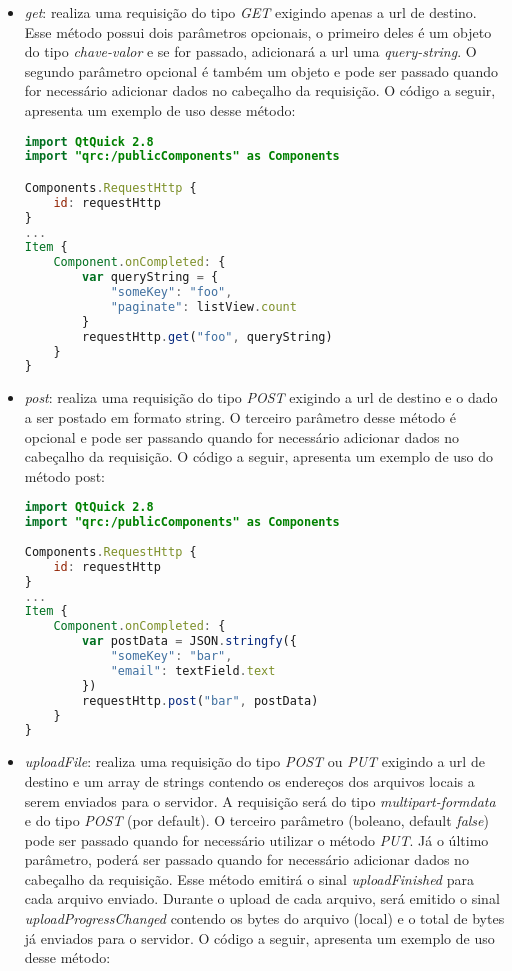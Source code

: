 \begin{itemize}
	\item \textit{get}: realiza uma requisição do tipo \textit{GET} exigindo apenas a url de destino. Esse método possui dois parâmetros opcionais, o primeiro deles é um objeto do tipo \textit{chave-valor} e se for passado, adicionará a url uma \textit{query-string}. O segundo parâmetro opcional é também um objeto e pode ser passado quando for necessário adicionar dados no cabeçalho da requisição. O código a seguir, apresenta um exemplo de uso desse método:

\begin{center}
\begin{lstlisting}[language=qml]
import QtQuick 2.8
import "qrc:/publicComponents" as Components

Components.RequestHttp {
	id: requestHttp
}
...
Item {
	Component.onCompleted: {
		var queryString = {
			"someKey": "foo",
			"paginate": listView.count
		}
		requestHttp.get("foo", queryString)
	}
}
\end{lstlisting}
\end{center}


	\item \textit{post}: realiza uma requisição do tipo \textit{POST} exigindo a url de destino e o dado a ser postado em formato string. O terceiro parâmetro desse método é opcional e pode ser passando quando for necessário adicionar dados no cabeçalho da requisição. O código a seguir, apresenta um exemplo de uso do método post:

\begin{center}
\begin{lstlisting}[language=qml]
import QtQuick 2.8
import "qrc:/publicComponents" as Components
	
Components.RequestHttp {
	id: requestHttp
}
...
Item {
	Component.onCompleted: {
		var postData = JSON.stringfy({
			"someKey": "bar",
			"email": textField.text
		})
		requestHttp.post("bar", postData)
	}
}
\end{lstlisting}
\end{center}


	\item \textit{uploadFile}: realiza uma requisição do tipo \textit{POST} ou \textit{PUT} exigindo a url de destino e um array de strings contendo os endereços dos arquivos locais a serem enviados para o servidor. A requisição será do tipo \textit{multipart-formdata} e do tipo \textit{POST} (por default). O terceiro parâmetro (boleano, default \textit{false}) pode ser passado quando for necessário utilizar o método \textit{PUT}. Já o último parâmetro, poderá ser passado quando for necessário adicionar dados no cabeçalho da requisição. Esse método emitirá o sinal \textit{uploadFinished} para cada arquivo enviado. Durante o upload de cada arquivo, será emitido o sinal \textit{uploadProgressChanged} contendo os bytes do arquivo (local) e o total de bytes já enviados para o servidor. O código a seguir, apresenta um exemplo de uso desse método:


\end{itemize}
